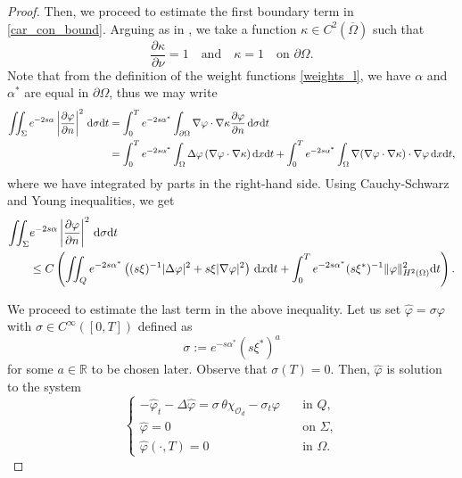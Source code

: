 \documentclass{aims}
\theoremstyle{definition}
\def\dx{\,\textnormal{d}x}
\def\dt{\textnormal{d}t}
\def\d{\,\textnormal{d}}
\begin{document}
\begin{proof}
Then, we proceed to estimate the first boundary term in \eqref{car_con_bound}. Arguing as in \cite{duprez_lissy}, we take a function $\kappa\in C^2(\overline \Omega)$ such that
%
\begin{equation*}
\frac{\partial \kappa}{\partial \nu}=1 \quad\text{and}\quad \kappa=1 \quad \text{on } \partial \Omega.
\end{equation*}
%
Note that from the definition of the weight functions \eqref{weights_l}, we have $\alpha$ and $\alpha^*$ are equal in $\partial \Omega$, thus we may write
%
\begin{equation*}
\begin{split}
\iint_{\Sigma}e^{-2s\alpha}\left|\frac{\partial \varphi}{\partial n}\right|^2\d\sigma\dt&=\int_{0}^{T}e^{-2s\alpha^*}\int_{\partial \Omega}\nabla\varphi\cdot \nabla \kappa\frac{\partial \varphi}{\partial n} \d\sigma \dt\\
&=\int_{0}^{T}e^{-2s\alpha^*}\int_{\Omega}\Delta \varphi\,(\nabla\varphi\cdot \nabla \kappa)\dx\dt+\int_{0}^Te^{-2s\alpha^*}\int_\Omega\nabla (\nabla\varphi\cdot\nabla\kappa)\cdot\nabla \varphi \dx\dt,
\end{split}
\end{equation*}
%
where we have integrated by parts in the right-hand side. Using Cauchy-Schwarz and Young inequalities, we get
%
\begin{equation}\label{estimate_1}
\begin{split}
\iint_{\Sigma}&e^{-2s\alpha}\left|\frac{\partial \varphi}{\partial n}\right|^2\d\sigma \dt\\
&\leq C\left(\iint_Q e^{-2s\alpha^*}\left((s\xi)^{-1}|\Delta \varphi|^2 + s\xi|\nabla \varphi|^2\right)\dx\dt+\int_{0}^{T}e^{-2s\alpha^*}(s\xi^*)^{-1}\|\varphi\|^2_{H^2(\Omega)}\dt\right).
\end{split}
\end{equation}

We proceed to estimate the last term in the above inequality. Let us set $\widehat \varphi=\sigma\varphi$ with $\sigma\in C^\infty([0,T])$ defined as
%
\begin{equation}\label{rho_def}
\sigma:=e^{-s\alpha^*}(s\xi^*)^a
\end{equation}
%
for some $a\in \mathbb R$ to be chosen later. Observe that $\sigma(T)=0$. Then, $\widehat{\varphi}$ is solution to the system
%
\begin{equation}\label{phi_gorro}
\begin{cases}
-\widehat\varphi_t-\Delta \widehat\varphi=\sigma\,\theta\chi_{\mathcal O_d}-\sigma_t\varphi \quad& \text{in } Q, \\
\widehat\varphi=0 \quad& \text{on } \Sigma, \\
\widehat{\varphi}(\cdot,T)=0 \quad&\text{in } \Omega.
\end{cases}
\end{equation}


\end{proof}
\end{document}
